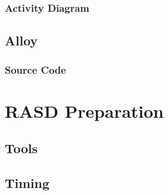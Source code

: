 \documentclass[11pt,a4paper]{report}
\begin{document}
\subsection{Activity Diagram}
\section{Alloy}
\subsection{Source Code}
\chapter{RASD Preparation}
\section{Tools}
\section{Timing}



\end{document}
